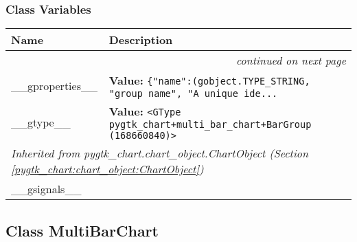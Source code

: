 
  \subsubsection{Class Variables}

    \vspace{-1cm}
\hspace{\varindent}\begin{longtable}{|p{\varnamewidth}|p{\vardescrwidth}|l}
\cline{1-2}
\cline{1-2} \centering \textbf{Name} & \centering \textbf{Description}& \\
\cline{1-2}
\endhead\cline{1-2}\multicolumn{3}{r}{\small\textit{continued on next page}}\\\endfoot\cline{1-2}
\endlastfoot\raggedright \_\-\_\-g\-p\-r\-o\-p\-e\-r\-t\-i\-e\-s\-\_\-\_\- & \raggedright \textbf{Value:} 
{\tt \{"name":(gobject.TYPE\_STRING, "group name", "A unique ide\texttt{...}}&\\
\cline{1-2}
\raggedright \_\-\_\-g\-t\-y\-p\-e\-\_\-\_\- & \raggedright \textbf{Value:} 
{\tt {\textless}GType pygtk\_chart+multi\_bar\_chart+BarGroup (168660840){\textgreater}}&\\
\cline{1-2}
\multicolumn{2}{|l|}{\textit{Inherited from pygtk\_chart.chart\_object.ChartObject \textit{(Section \ref{pygtk_chart:chart_object:ChartObject})}}}\\
\multicolumn{2}{|p{\varwidth}|}{\raggedright \_\_gsignals\_\_}\\
\cline{1-2}
\end{longtable}



\subsection{Class MultiBarChart}

